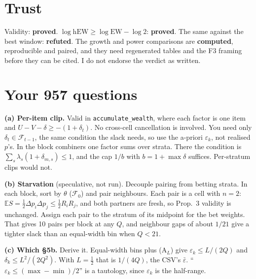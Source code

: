 \documentclass[11pt]{article}
\begin{document}
\section*{Trust}
Validity: \textbf{proved}. $\log\text{hEW}\ge\log\text{EW}-\log2$: \textbf{proved}. The same against the best window: \textbf{refuted}. The growth and power comparisons are \textbf{computed}, reproducible and paired, and they need regenerated tables and the F3 framing before they can be cited. I do not endorse the verdict as written.

\section*{Your 957 questions}
\textbf{(a) Per-item clip.} Valid in \texttt{accumulate\_wealth}, where each factor is one item and $U-V-\delta\ge-(1+\delta_t)$. No cross-cell cancellation is involved. You need only $\delta_t\in\mathcal F_{t-1}$, the same condition the slack needs, so use the a-priori $\varepsilon_k$, not realised $p$'s. In the block combiners one factor sums over strata. There the condition is $\sum_s\lambda_s(1+\delta_{m,s})\le1$, and the cap $1/b$ with $b=1+\max\delta$ suffices. Per-stratum clips would not.

\textbf{(b) Starvation} (speculative, not run). Decouple pairing from betting strata. In each block, sort by $\theta$ ($\mathcal F_0$) and pair neighbours. Each pair is a cell with $n=2$: $\mathbb E S=\frac12\Delta p_i\Delta p_j\le\frac12R_iR_j$, and both partners are fresh, so Prop.~3 validity is unchanged. Assign each pair to the stratum of its midpoint for the bet weights. That gives 10 pairs per block at any $Q$, and neighbour gaps of about $1/21$ give a tighter slack than an equal-width bin when $Q<21$.

\textbf{(c) Which \S5b.} Derive it. Equal-width bins plus (A$_L$) give $\varepsilon_k\le L/(2Q)$ and $\delta_k\le L^2/(2Q^2)$. With $L=\frac12$ that is $1/(4Q)$, the CSV's $\bar\varepsilon$. ``$\varepsilon_k\le(\max-\min)/2$'' is a tautology, since $\varepsilon_k$ is the half-range.
\end{document}
